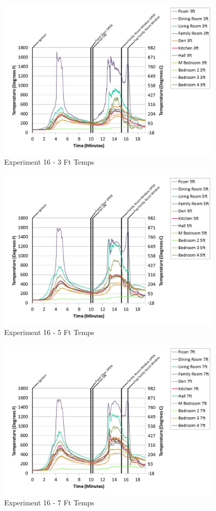 \documentclass{article}
\begin{document}
\begin{appendices}
	\begin{figure}[h!]
		\centering
		\includegraphics[height=3.05in]{0_Images/Results_Charts/Exp_16_Charts/3FtTemps.pdf}
		\caption{Experiment 16 - 3 Ft Temps}
	\end{figure}
 
	\clearpage

	\begin{figure}[h!]
		\centering
		\includegraphics[height=3.05in]{0_Images/Results_Charts/Exp_16_Charts/5FtTemps.pdf}
		\caption{Experiment 16 - 5 Ft Temps}
	\end{figure}
 

	\begin{figure}[h!]
		\centering
		\includegraphics[height=3.05in]{0_Images/Results_Charts/Exp_16_Charts/7FtTemps.pdf}
		\caption{Experiment 16 - 7 Ft Temps}
	\end{figure}
 

\end{appendices}
\end{document}
